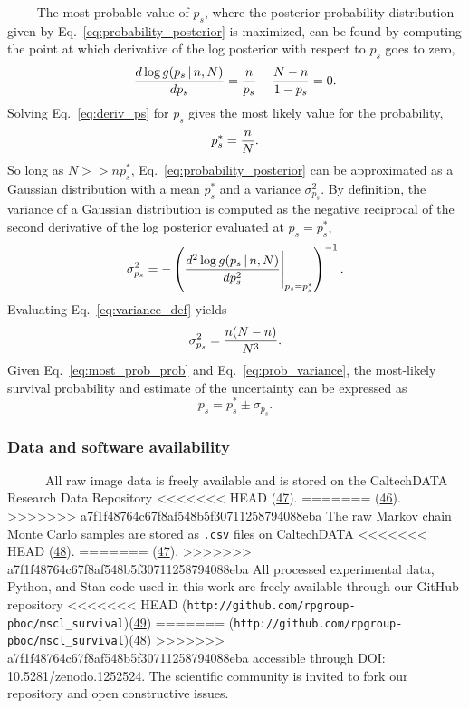 ~~~~
The
most
probable
value
of
\(p_s\),
where
the
posterior
probability
distribution
given
by
Eq.~\ref{eq:probability_posterior}
is
maximized,
can be
found
by
computing
the
point
at
which
derivative
of the
log
posterior
with
respect
to
\(p_s\)
goes
to
zero,
\begin{equation}
{d\log g(p_s\,\vert\,n, N) \over d p_s} = {n \over p_s} - {N - n  \over 1 - p_s} = 0.
\label{eq:deriv_ps}\end{equation}
Solving
Eq.~\ref{eq:deriv_ps}
for
\(p_s\)
gives
the
most
likely
value
for
the
probability,
\begin{equation}
p_s^* = {n \over N}.
\label{eq:most_prob_prob}\end{equation}
So
long
as
\(N >> np_s^*\),
Eq.~\ref{eq:probability_posterior}
can be
approximated
as a
Gaussian
distribution
with a
mean
\(p_s^*\)
and a
variance
\(\sigma_{p_s}^2\).
By
definition,
the
variance
of a
Gaussian
distribution
is
computed
as the
negative
reciprocal
of the
second
derivative
of the
log
posterior
evaluated
at
\(p_s = p_s^*\),
\begin{equation}
\sigma_{p_s}^2 = - \left({d^2 \log g(p_s\,\vert\, n, N) \over dp_s^2}\Bigg\vert_{p_s=p_s^*}\right)^{-1}.
\label{eq:variance_def}\end{equation}
Evaluating
Eq.~\ref{eq:variance_def}
yields
\begin{equation}
\sigma_{p_s}^2 = {n(N-n)\over N^3}.
\label{eq:prob_variance}\end{equation}
Given
Eq.~\ref{eq:most_prob_prob}
and
Eq.~\ref{eq:prob_variance},
the
most-likely
survival
probability
and
estimate
of the
uncertainty
can be
expressed
as
\begin{equation}
p_s = p_s^* \pm \sigma_{p_s}.
\end{equation}

\subsubsection{Data
and
software
availability}\label{data-and-software-availability}

~ ~ ~
~All
raw
image
data
is
freely
available
and is
stored
on the
CaltechDATA
Research
Data
Repository
<<<<<<< HEAD
(\protect\hyperlink{ref-chure2018a}{47}).
=======
(\protect\hyperlink{ref-chure2018a}{46}).
>>>>>>> a7f1f48764c67f8af548b5f30711258794088eba
The
raw
Markov
chain
Monte
Carlo
samples
are
stored
as
\texttt{.csv}
files
on
CaltechDATA
<<<<<<< HEAD
(\protect\hyperlink{ref-chure2018}{48}).
=======
(\protect\hyperlink{ref-chure2018}{47}).
>>>>>>> a7f1f48764c67f8af548b5f30711258794088eba
All
processed
experimental
data,
Python,
and
Stan
code
used
in
this
work
are
freely
available
through
our
GitHub
repository
<<<<<<< HEAD
(\texttt{http://github.com/rpgroup-pboc/mscl\_survival})(\protect\hyperlink{ref-chure2018b}{49})
=======
(\texttt{http://github.com/rpgroup-pboc/mscl\_survival})(\protect\hyperlink{ref-chure2018b}{48})
>>>>>>> a7f1f48764c67f8af548b5f30711258794088eba
accessible
through
DOI:
10.5281/zenodo.1252524.
The
scientific
community
is
invited
to
fork
our
repository
and
open
constructive
issues.

